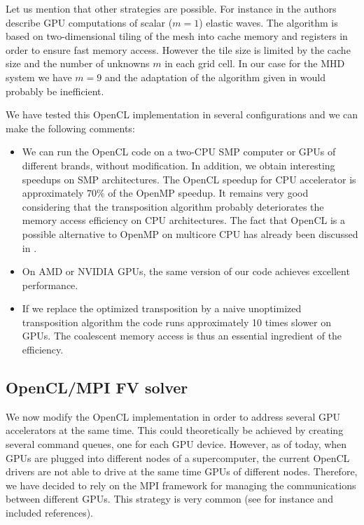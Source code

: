 \documentclass[12pt]{amsart}
\begin{document}
Let us mention that other strategies are possible. For instance in \cite{michea2010accelerating} the authors describe GPU computations of scalar ($m=1$) elastic waves. The algorithm is based on two-dimensional tiling of the mesh into cache memory and registers in order to ensure fast memory access. However the tile size is limited by the cache size and the number of unknowns $m$ in each grid cell. In our case for the MHD system we have $m=9$ and the adaptation of the algorithm given in \cite{michea2010accelerating} would probably be inefficient.

We have tested this OpenCL implementation in several configurations and we can make the following comments:
\begin{itemize}
\item We can run the OpenCL code on a two-CPU SMP computer or GPUs of different brands, without modification. In addition,  we obtain interesting speedups on SMP architectures. The OpenCL speedup for CPU accelerator is approximately $70\%$ of the OpenMP speedup. It remains very good considering that the transposition algorithm probably  deteriorates the memory access efficiency on CPU architectures. The fact that OpenCL is a possible alternative to OpenMP on multicore CPU has already been discussed in \cite{shen2012performance}.
\item  On AMD or NVIDIA GPUs, the same version of our code achieves excellent performance.
\item If we replace the optimized transposition by a naive unoptimized transposition algorithm the code runs approximately 10 times slower on GPUs. The coalescent memory access is thus an essential ingredient of the efficiency.
\end{itemize}

\subsection{OpenCL/MPI FV solver}

We now modify the OpenCL implementation in order to address several GPU accelerators at the same time. This could theoretically be achieved by creating several command queues, one for each GPU device. However, as of today, when GPUs are plugged into different nodes of a supercomputer, the current OpenCL drivers are not able to drive at the same time GPUs of different nodes. Therefore, we have decided to rely on the MPI framework for managing the communications between different GPUs. This strategy is very common (see for instance \cite{aubert2010numerical,cabel2011multi,helluy2014two} and included references).
\end{document}
